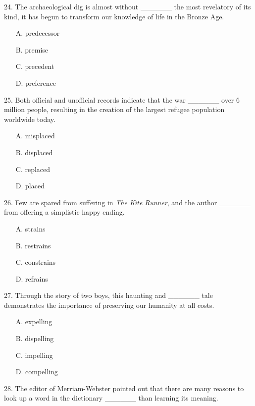 \documentclass[UTF8,11pt]{ctexart}
\begin{document}
24. The archaeological dig is almost without \_\_\_\_\_\_ the most revelatory of its kind, it has begun to transform our knowledge of life in the Bronze Age.


\begin{itemize}[leftmargin=2em,itemsep=.2em,topsep=.4em]\item[A.] predecessor
\item[B.] premise
\item[C.] precedent
\item[D.] preference
\end{itemize}

25. Both official and unofficial records indicate that the war \_\_\_\_\_\_ over 6 million people, resulting in the creation of the largest refugee population worldwide today.


\begin{itemize}[leftmargin=2em,itemsep=.2em,topsep=.4em]\item[A.] misplaced
\item[B.] displaced
\item[C.] replaced
\item[D.] placed
\end{itemize}

26. Few are spared from suffering in \textit{The Kite Runner}, and the author \_\_\_\_\_\_ from offering a simplistic happy ending.


\begin{itemize}[leftmargin=2em,itemsep=.2em,topsep=.4em]\item[A.] strains
\item[B.] restrains
\item[C.] constrains
\item[D.] refrains
\end{itemize}

27. Through the story of two boys, this haunting and \_\_\_\_\_\_ tale demonstrates the importance of preserving our humanity at all costs.


\begin{itemize}[leftmargin=2em,itemsep=.2em,topsep=.4em]\item[A.] expelling
\item[B.] dispelling
\item[C.] impelling
\item[D.] compelling
\end{itemize}

28. The editor of Merriam-Webster pointed out that there are many reasons to look up a word in the dictionary \_\_\_\_\_\_ than learning its meaning.
\end{document}
